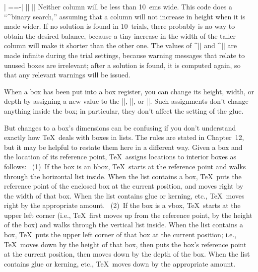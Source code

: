 {{{{{{{{|  =\vbox{\hsize=\doublewidth\advance\hsize-\trialwidth\secondcol}}|
|\def\testfailure{\dimen0=\ht0 \advance\dimen0-\ht2|
|  \ifnum\dimen0<0 \dimen0=-\dimen0 \fi|
|  \ifdim\dimen0>\delheight \ifnum\n=10 \failfalse\else\failtrue\fi|
|  \else\failfalse\fi}|
|\def\preparenewtrial{\ifdim\ht0>\ht2 \global\lowwidth=\trialwidth|
|  \else\global\highwidth=\trialwidth\fi \advance\n by1 }|
\endlines
Neither column will be less than 10~ems wide.  This code does a ``^{binary
search},'' assuming that a column will not increase in height when it is
made wider. If no solution is found in 10~trials, there probably is no way
to obtain the desired balance, because a tiny increase in the width of the
taller column will make it shorter than the other one.  The values of\/
^|\hbadness| and ^|\hfuzz| are made infinite during the trial settings,
because warning messages that relate to unused boxes are irrelevant; after
a solution is found, it is computed again, so that any relevant warnings
will be issued.

When a box has been put into a box register, you can change its
height, width, or depth by assigning a new value to the |\ht|, |\wd|,
or |\dp|. Such assignments don't change anything inside the box;
in particular, they don't affect the setting of the glue.

But changes to a box's dimensions can be confusing if you don't understand
exactly how \TeX\ deals with boxes in lists. The rules are stated in
Chapter~12, but it may be helpful to restate them here in a different way.
Given a box and the location of its reference point, \TeX\ assigns
locations to interior boxes as follows:  \ (1)~If the box is an hbox,
\TeX\ starts at the reference point and walks through the horizontal list
inside. When the list contains a box, \TeX\ puts the reference point of
the enclosed box at the current position, and moves right by the width of
that box.  When the list contains glue or kerning, etc., \TeX\ moves right
by the appropriate amount. \ (2)~If the box is a vbox, \TeX\ starts at the
upper left corner (i.e., \TeX\ first moves up from the reference point, by
the height of the box) and walks through the vertical list inside. When
the list contains a box, \TeX\ puts the upper left corner of that
box at the current position; i.e., \TeX\ moves down by the height of that
box, then puts the box's reference point at the current position, then
moves down by the depth of the box. When the list contains glue or
kerning, etc., \TeX\ moves down by the appropriate amount.

}}}}}}}
